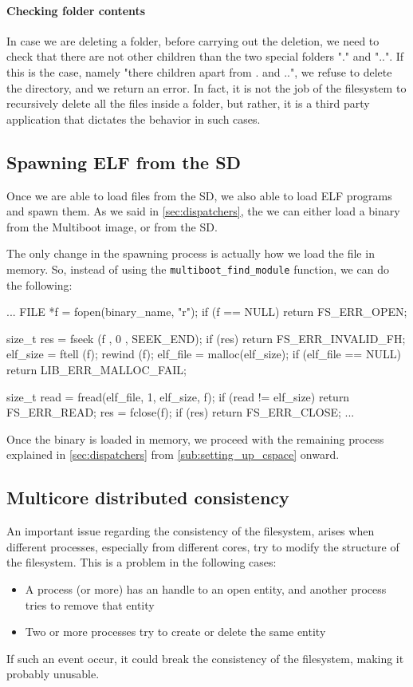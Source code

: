 \documentclass[a4paper,twoside,openright]{report}
\renewcommand{\t}[1]{%
	{\texttt{#1}}}
\begin{document}
\paragraph{Checking folder contents}
In case we are deleting a folder, before carrying out the deletion, we need to check that there are not other children than the two special folders "." and "..".
If this is the case, namely "there children apart from . and ..", we refuse to delete the directory, and we return an error.
In fact, it is not the job of the filesystem to recursively delete all the files inside a folder, but rather, it is a third party application that dictates the behavior in such cases.

\subsection{Spawning ELF from the SD}
Once we are able to load files from the SD, we also able to load ELF programs and spawn them.
As we said in \ref{sec:dispatchers}, the we can either load a binary from the Multiboot image, or from the SD.

The only change in the spawning process is actually how we load the file in memory. So, instead of using the \t{multiboot\_find\_module} function, we can do the following:
\begin{pandacode}
...
FILE *f = fopen(binary_name, "r");
if (f == NULL) return FS_ERR_OPEN;

size_t res = fseek (f , 0 , SEEK_END);
if (res) return FS_ERR_INVALID_FH;
elf_size = ftell (f);
rewind (f);
elf_file = malloc(elf_size);
if (elf_file == NULL) return LIB_ERR_MALLOC_FAIL;

size_t read = fread(elf_file, 1, elf_size, f);
if (read != elf_size) return FS_ERR_READ;
res = fclose(f);
if (res) return FS_ERR_CLOSE;
...
\end{pandacode} 

Once the binary is loaded in memory, we proceed with the remaining process explained in \ref{sec:dispatchers} from \ref{sub:setting_up_cspace} onward.

\subsection{Multicore distributed consistency}
\label{sub:multi_dist_cons}
An important issue regarding the consistency of the filesystem, arises when different processes, especially from different cores, try to modify the structure of the filesystem.
This is a problem in the following cases:
\begin{itemize}
    \item A process (or more) has an handle to an open entity, and another process tries to remove that entity
    \item Two or more processes try to create or delete the same entity
\end{itemize}
If such an event occur, it could break the consistency of the filesystem, making it probably unusable.
\end{document}
